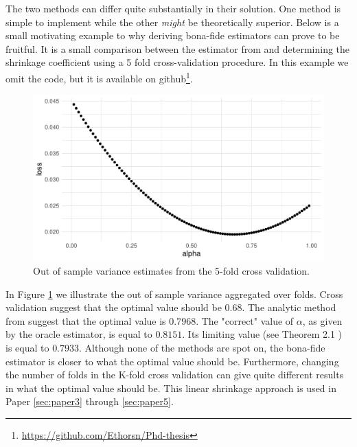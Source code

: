 \documentclass[]{book}\usepackage{knitr}
\begin{document}
The two methods can differ quite substantially in their solution. 
One method is simple to implement while the other \textit{might} be theoretically superior.
Below is a small motivating example to why deriving bona-fide estimators can prove to be fruitful.
It is a small comparison between the estimator from \citet{bodnar2018estimation} and determining the shrinkage coefficient using a 5 fold cross-validation procedure.
In this example we omit the code, but it is available on github\footnote{\url{https://github.com/Ethorsn/Phd-thesis}}.
\begin{knitrout}
\color{fgcolor}\begin{figure}

{\centering \includegraphics[width=\maxwidth]{figure/cv_benchmark-1} 

}

\caption[Out of sample variance estimates from the 5-fold cross validation]{Out of sample variance estimates from the 5-fold cross validation.}\label{fig:cv_benchmark}
\end{figure}

\end{knitrout}

In Figure \ref{fig:cv_benchmark} we illustrate the out of sample variance aggregated over folds. 
Cross validation suggest that the optimal value should be $0.68$. 
The analytic method from \citet{bodnar2018estimation} suggest that the optimal value is $0.7968$.
The "correct" value of $\alpha$, as given by the oracle estimator, is equal to $0.8151$. 
Its limiting value (see Theorem 2.1 \citet{bodnar2018estimation}) is equal to $0.7933$.
Although none of the methods are spot on, the bona-fide estimator is closer to what the optimal value should be.
Furthermore, changing the number of folds in the K-fold cross validation can give quite different results in what the optimal value should be.
This linear shrinkage approach is used in Paper \ref{sec:paper3} through \ref{sec:paper5}.
\end{document}
